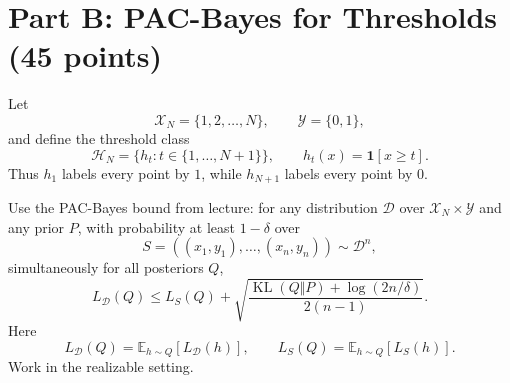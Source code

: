 \documentclass{article}
\begin{document}
\section{Part B: PAC-Bayes for Thresholds (45 points)}

Let
$$
\mathcal{X}_N = \{1,2,\dots,N\},
\qquad
\mathcal{Y} = \{0,1\},
$$
and define the threshold class
$$
\mathcal{H}_N = \{h_t : t \in \{1,\dots,N+1\}\},
\qquad
h_t(x)=\mathbf{1}[x\ge t].
$$
Thus $h_1$ labels every point by $1$, while $h_{N+1}$ labels every point by $0$.

Use the PAC-Bayes bound from lecture: for any distribution $\mathcal{D}$ over $\mathcal{X}_N\times\mathcal{Y}$ and any prior $P$, with probability at least $1-\delta$ over
$$
S=((x_1,y_1),\dots,(x_n,y_n)) \sim \mathcal{D}^n,
$$
simultaneously for all posteriors $Q$,
$$
L_{\mathcal{D}}(Q)
\le
L_S(Q)
+
\sqrt{
\frac{
\operatorname{KL}(Q\Vert P)+\log(2n/\delta)
}{
2(n-1)
}
}.
$$
Here
$$
L_{\mathcal{D}}(Q) = \mathbb{E}_{h\sim Q}[L_{\mathcal{D}}(h)],
\qquad
L_S(Q) = \mathbb{E}_{h\sim Q}[L_S(h)].
$$
Work in the realizable setting.
\end{document}
